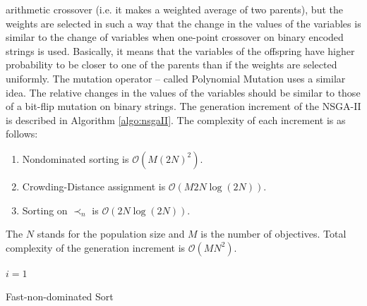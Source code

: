 arithmetic crossover (i.e. it makes a weighted average of two parents),
but the weights are selected in such a way that the change in the
values of the variables is similar to the change of variables when
one-point crossover on binary encoded strings is used. Basically, it
means that the variables of the offspring have higher probability to be
closer to one of the parents than if the weights are selected uniformly.
The mutation operator \cite{DebGoyalCombinedGeneticAdaptiveSearch} – called Polynomial Mutation uses a similar idea. The relative changes in the values of the
variables should be similar to those of a bit-flip mutation on binary
strings.
The generation increment of the NSGA-II is described in Algorithm \ref{algo:nsgaII}. The complexity of each increment is as follows:
\begin{enumerate}
	\item Nondominated sorting is $\mathcal{O}(M(2N)^2)$.
	\item Crowding-Distance assignment is $\mathcal{O}(M2N\log(2N))$.
	\item Sorting on $\prec_n$ is $\mathcal{O}(2N\log(2N))$.
\end{enumerate}
The $N$ stands for the population size and $M$ is the number of objectives.
Total complexity of the generation increment is $\mathcal{O}(MN^2)$.

\IncMargin{1em}
\begin{algorithm}	
	\BlankLine	
	$i=1$\;
	\caption{Fast-non-dominated Sort}\label{algo:fastNonDominatedSort}
\end{algorithm}\DecMargin{1em}


